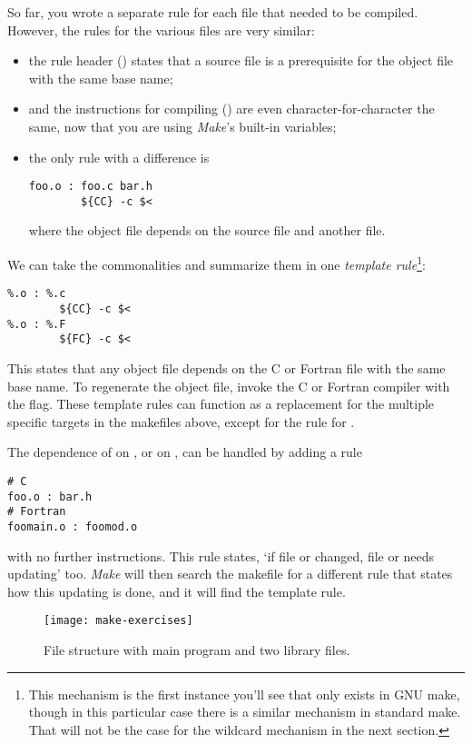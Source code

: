 So far, you wrote a separate rule for each file that
needed to be compiled. However, the rules for the various 
files are very similar:
\begin{itemize}
\item the rule header () states that a source file is a
  prerequisite for the object file with the same base name;
\item and the instructions for compiling () 
  are even character-for-character the
  same, now that you are using \emph{Make}'s built-in variables;
\item the only rule with a difference is 
\begin{verbatim}
foo.o : foo.c bar.h
        ${CC} -c $<
\end{verbatim}
  where the object file depends on the source file and another file.
\end{itemize}
We can take the commonalities and summarize them in one 
\emph{template rule}\footnote
{This mechanism is the first instance you'll see that only exists in
  GNU make, though in this particular case there is a similar
  mechanism in standard make. That will not be the case for the
  wildcard mechanism in the next section.}:
\begin{verbatim}
%.o : %.c
        ${CC} -c $<
%.o : %.F
        ${FC} -c $<
\end{verbatim}
This states that any object file depends on the C or Fortran file with
the same base name. To regenerate the object file, invoke the C or
Fortran compiler with the  flag.
These template rules can function as a replacement for the multiple
specific targets in the makefiles above, except for the rule for .

The dependence of  on , or  on
, can be handled by adding a rule
\begin{verbatim}
# C
foo.o : bar.h
# Fortran
foomain.o : foomod.o
\end{verbatim}
with no further instructions. This rule states, `if file
 or  changed, file  or 
needs updating' too. \emph{Make} will
then search the makefile for a different
rule that states how this updating is done, and it will find the
template rule.


\begin{figure}[ht]
  \texttt{[image: make-exercises]}
  \caption{File structure with main program and two library files.}
  \label{fig:make-exercises}
\end{figure}

